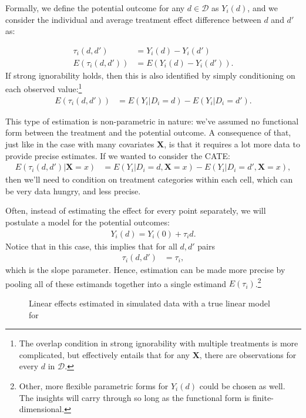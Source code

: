 \documentclass{tufte-handout}
\theoremstyle{break}
\newcommand{\bX}{\mathbf{X}}
\begin{document}
Formally, we define the potential outcome for any $d \in \mathcal{D}$ as $Y_{i}(d)$, and we consider the individual and average treatment effect difference between $d$ and $d'$ as:

\begin{align*}
    \tau_{i}(d, d') &= Y_{i}(d) - Y_{i}(d')\\
    E(\tau_{i}(d, d')) &= E(Y_{i}(d) - Y_{i}(d')).
\end{align*}
If strong ignorability holds, then this is also identified by simply conditioning on each observed value:\footnote{The overlap condition in strong ignorability with multiple treatments is more complicated, but effectively entails that for any $\bX$, there are observations for every $d$ in $\mathcal{D}.$}
\begin{align*}
  E(\tau_{i}(d, d'))  &= E(Y_{i} | D_{i} = d) - E(Y_{i} | D_{i} = d').
\end{align*}

This type of estimation is non-parametric in nature: we've assumed no functional form between the treatment and the potential outcome. A consequence of that, just like in the case with many covariates $\bX$, is that it requires a lot more data to provide precise estimates. If we wanted to consider the CATE:
\begin{align*}
  E(\tau_{i}(d, d')| \bX = x)  &= E(Y_{i} | D_{i} = d, \bX = x) - E(Y_{i} | D_{i} = d', \bX = x),
\end{align*}
then we'll need to condition on treatment categories within each cell, which can be very data hungry, and less precise. 

Often, instead of estimating the effect for every point separately, we will postulate a model for the potential outcomes: 
\begin{align*}
  Y_{i}(d) = Y_{i}(0) + \tau_{i} d.
\end{align*}
Notice that in this case, this implies that for all $d, d'$ pairs
\begin{align*}
  \tau_{i}(d, d') &= \tau_{i},
\end{align*}
which is the slope parameter. Hence, estimation can be made more precise by pooling all of these estimands together into a single estimand $E(\tau_{i})$.\footnote{Other, more flexible parametric forms for $Y_{i}(d)$ could be chosen as well. The insights will carry through so long as the functional form is finite-dimensional.}


\begin{figure*}
  \caption{Linear effects estimated in simulated data with a true linear model for }
  \label{fig:linearmodel1}
\end{figure*}
\end{document}
